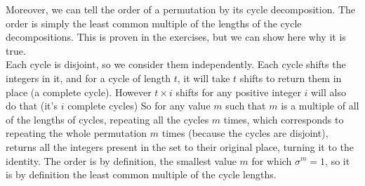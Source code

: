 \documentclass[12pt]{article}
\begin{document}
    Moreover, we can tell the order of a permutation
    by its cycle decomposition.
    The order is simply the least common multiple of the lengths
    of the cycle decompositions.
    This is proven in the exercises,
    but we can show here why it is true. \\
    Each cycle is disjoint,
    so we consider them independently.
    Each cycle shifts the integers in it,
    and for a cycle of length $t$,
    it will take $t$ shifts to return them in place
    (a complete cycle).
    However $t \times i$ shifts
    for any positive integer $i$ will also do that
    (it's $i$ complete cycles)
    So for any value $m$ such that $m$ is a multiple of
    all of the lengths of cycles,
    repeating all the cycles $m$ times,
    which corresponds to repeating the whole permutation $m$ times
    (because the cycles are disjoint),
    returns all the integers present in the set to their original place,
    turning it to the identity.
    The order is by definition,
    the smallest value $m$ for which $\sigma^m = 1$,
    so it is by definition the least common multiple
    of the cycle lengths. \\
\end{document}
